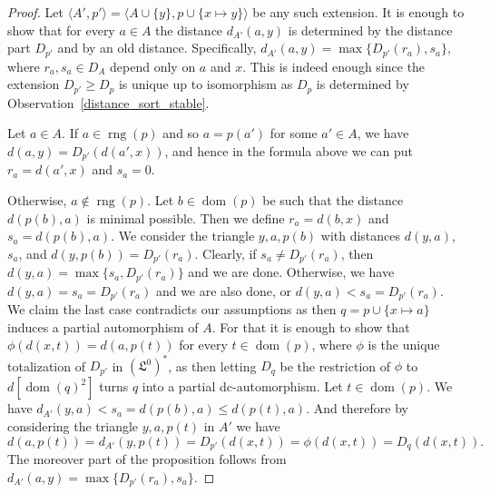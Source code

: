 \documentclass[10pt,a4paper]{amsart}
\newcommand \Lin {\mathfrak{L}}
\newcommand \dom {\operatorname{dom}}
\newcommand \rng {\operatorname{rng}}
\newcommand \seq [1]{\langle #1 \rangle}
\newcommand \set [1]{\{#1\}}
\begin{document}
\begin{proof}
    Let $\seq{A', p'} = \seq{A \cup \set{y}, p \cup \set{x \mapsto y}}$ be any such extension.
    It is enough to show that for every $a \in A$ the distance $d_{A'}(a, y)$ is determined by the distance part $D_{p'}$ and by an old distance.
    Specifically, $d_{A'}(a, y) = \max\set{D_{p'}(r_a), s_a}$, where $r_a, s_a \in D_A$ depend only on $a$ and $x$.
    This is indeed enough since the extension $D_{p'} \geq D_p$ is unique up to isomorphism as $D_p$ is determined by Observation~\ref{distance_sort_stable}.

    Let $a \in A$.
    If $a \in \rng(p)$ and so $a = p(a')$ for some $a' \in A$, we have $d(a, y) = D_{p'}(d(a', x))$, and hence in the formula above we can  put $r_a = d(a', x)$ and $s_a = 0$.
    
    Otherwise, $a \notin \rng(p)$.
    Let $b \in \dom(p)$ be such that the distance $d(p(b), a)$ is minimal possible.
    Then we define $r_a = d(b, x)$ and $s_a = d(p(b), a)$.
    We consider the triangle $y, a, p(b)$ with distances $d(y, a)$, $s_a$, and $d(y, p(b))= D_{p'}(r_a)$.
    Clearly, if $s_a \neq D_{p'}(r_a)$, then $d(y, a) = \max\set{s_a, D_{p'}(r_a)}$ and we are done.
    Otherwise, we have $d(y, a) = s_a = D_{p'}(r_a)$ and we are also done, or $d(y, a) < s_a = D_{p'}(r_a)$.
    We claim the last case contradicts our assumptions as then $q = p \cup \set{x \mapsto a}$ induces a partial automorphism of $A$.
    For that it is enough to show that $\phi(d(x, t)) = d(a, p(t))$ for every $t \in \dom(p)$, where $\phi$ is the unique totalization of $D_{p'}$ in $(\Lin^0)^*$, as then letting $D_q$ be the restriction of $\phi$ to $d[\dom(q)^2]$ turns $q$ into a partial dc-automorphism.
    Let $t \in \dom(p)$.
    We have $d_{A'}(y, a) < s_a = d(p(b), a) \leq d(p(t), a)$.
    And therefore by considering the triangle $y, a, p(t)$ in $A'$ we have
    \[
        d(a, p(t)) = d_{A'}(y, p(t)) = D_{p'}(d(x, t)) = \phi(d(x, t)) = D_q(d(x, t)).
    \]
%
    The moreover part of the proposition follows from $d_{A'}(a, y) = \max\set{D_{p'}(r_a), s_a}$.
\end{proof}
\end{document}

